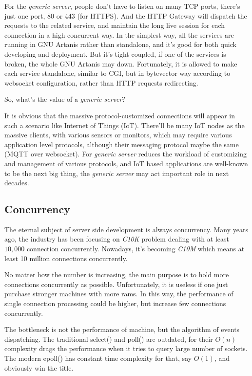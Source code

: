 \documentclass[numbers,numberedpars]{sigplanconf}
\begin{document}
For the {\it generic server}, people don't have to listen on many TCP ports, there's just one port, 80 or 443 (for HTTPS). And the HTTP
Gateway will dispatch the requests to the related service, and maintain the long live session for each connection in a high concurrent way.
In the simplest way, all the services are running in GNU Artanis rather than standalone, and it's good for both quick developing and deployment.
But it's tight coupled, if one of the services is broken, the whole GNU Artanis may down. Fortunately, it is allowed to make each service
standalone, similar to CGI, but in bytevector way according to websocket configuration, rather than HTTP requests redirecting.

So, what's the value of a {\it generic server}?

It is obvious that the massive protocol-customized connections will appear in such a scenario like Internet of Things (IoT).
There'll be many IoT nodes as the massive clients, with various sensors or monitors, which may require various application level protocols,
although their messaging protocol maybe the same (MQTT over websocket).
For {\it generic server} reduces the workload of customizing and management of various protocols, and IoT based applications are
well-known to be the next big thing, the {\it generic server} may act important role in next decades. 

\subsection{Concurrency} \label{Concurrency}

The eternal subject of server side development is always concurrency.
Many years ago, the industry has been focusing on {\it C10K} problem dealing with at least $10,000$ connection concurrently.
Nowadays, it's becoming {\it C10M} which means at least 10 million connections concurrently.

No matter how the number is increasing, the main purpose is to hold more connections concurrently as possible.
Unfortunately, it is useless if one just purchase stronger machines with more rams. In this way, the performance of single connection
processing could be higher, but increase few connections concurrently.

The bottleneck is not the performance of machine, but the algorithm of events dispatching. The traditional select() and poll() are outdated,
for their $O(n)$ complexity drags the performance when it tries to query large number of sockets. The modern epoll() has
constant time complexity for that, say $O(1)$, and obviously win the title.
\end{document}
